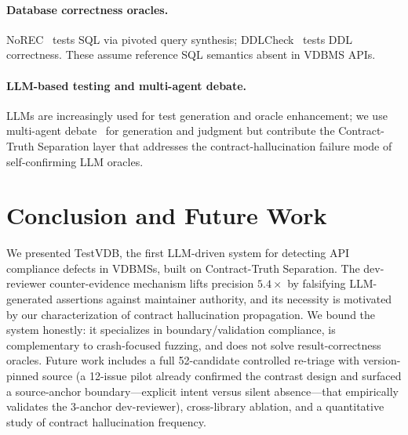 \documentclass[sigconf, anonymous, review]{acmart}
\begin{document}
\paragraph{Database correctness oracles.} NoREC~\cite{norec20} tests SQL via pivoted query synthesis; DDLCheck~\cite{ddlcheck25} tests DDL correctness. These assume reference SQL semantics absent in VDBMS APIs.
\paragraph{LLM-based testing and multi-agent debate.} LLMs are increasingly used for test generation and oracle enhancement; we use multi-agent debate~\cite{du2023improving} for generation and judgment but contribute the Contract-Truth Separation layer that addresses the contract-hallucination failure mode of self-confirming LLM oracles.

\section{Conclusion and Future Work}\label{sec:conc}
We presented TestVDB, the first LLM-driven system for detecting API compliance defects in VDBMSs, built on Contract-Truth Separation. The dev-reviewer counter-evidence mechanism lifts precision $5.4\times$ by falsifying LLM-generated assertions against maintainer authority, and its necessity is motivated by our characterization of contract hallucination propagation. We bound the system honestly: it specializes in boundary/validation compliance, is complementary to crash-focused fuzzing, and does not solve result-correctness oracles. Future work includes a full 52-candidate controlled re-triage with version-pinned source (a 12-issue pilot already confirmed the contrast design and surfaced a source-anchor boundary---explicit intent versus silent absence---that empirically validates the 3-anchor dev-reviewer), cross-library ablation, and a quantitative study of contract hallucination frequency.



\end{document}
